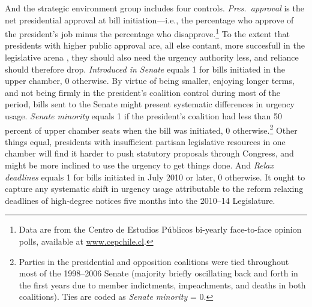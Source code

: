 \documentclass[letter,12pt]{article}
\begin{document}
And the strategic environment group includes four controls. \emph{Pres.~approval} is the net presidential approval at bill initiation---i.e., the percentage who approve of the president's job minus the percentage who disapprove.\footnote{Data are from the Centro de Estudios P\'ublicos bi-yearly face-to-face opinion polls, available at \url{www.cepchile.cl}.} To the extent that presidents with higher public approval are, all else contant, more succesfull in the legislative arena \citep{bond.fleisher.1990,aleman.navia.UrgChi.2009}, they should also need the urgency authority less, and reliance should therefore drop. \emph{Introduced in Senate} equals 1 for bills initiated in the upper chamber, 0 otherwise. By virtue of being smaller, enjoying longer terms, and not being firmly in the president's coalition control during most of the period, bills sent to the Senate might present systematic differences in urgency usage. \emph{Senate minority} equals 1 if the president's coalition had less than 50 percent of upper chamber seats when the bill was initiated, 0 otherwise.\footnote{Parties in the presidential and opposition coalitions were tied throughout most of the 1998--2006 Senate (majority briefly oscillating back and forth in the first years due to member indictments, impeachments, and deaths in both coalitions). Ties are coded as \emph{Senate minority} = 0.} Other things equal, presidents with insufficient partisan legislative resources in one chamber will find it harder to push statutory proposals through Congress, and might be more inclined to use the urgency to get things done. And \emph{Relax deadlines} equals 1 for bills initiated in July 2010 or later, 0 otherwise. It ought to capture any systematic shift in urgency usage attributable to the reform relaxing deadlines of high-degree notices five months into the 2010--14 Legislature. 
\end{document}
